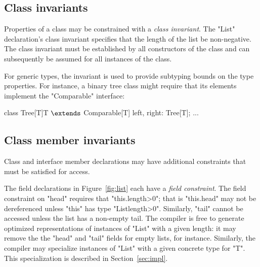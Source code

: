 \subsection{Class invariants}

Properties of a class may be constrained with 
a \emph{class invariant}.   
The \xcd"List" declaration's class invariant specifies that the length of
the list be non-negative.  
The class invariant must be established by all constructors of
the class and can subsequently be assumed for all instances of the class.

For generic types, the invariant is used to provide subtyping
bounds on the type properties.  For instance, a binary
tree class
might require that its elements implement the \xcd"Comparable"
interface:
\clearpage
{\footnotesize
\begin{xtenmath}
class Tree[T]{T $\extends$ Comparable[T]} {
  left, right: Tree[T]; ...
}
\end{xtenmath}}

\subsection{Class member invariants}

Class and interface member declarations may have additional
constraints that must be satisfied for access.

The field  declarations in Figure~\ref{fig:list}
each have a \emph{field constraint}.  The field constraint on
\xcd"head" requires that \xcd"this.length>0";
that is \xcd"this.head" may not be dereferenced
unless \xcd"this" has type \xcd"List{length>0}".  Similarly,
\xcd"tail" cannot be accessed unless the list has a non-empty tail.  The
compiler is free to generate optimized representations of
instances of \xcd"List" with a given length: it may remove the
the \xcd"head" and \xcd"tail" fields for empty lists, for
instance.  Similarly, the compiler may specialize instances of
\xcd"List" with a given concrete type for \xcd"T".  This
specialization is described in Section~\ref{sec:impl}.

